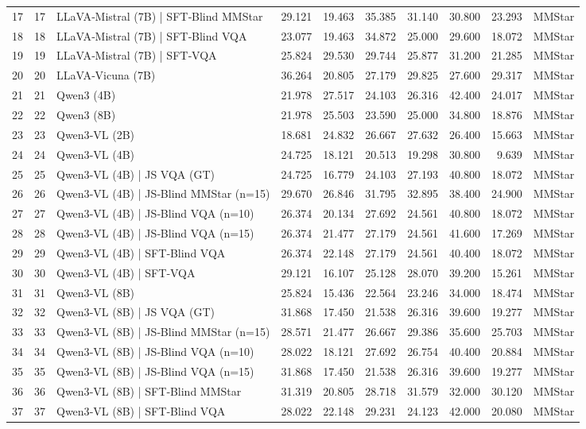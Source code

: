 \begin{tabular}{lrlrrrrrrl}
17 & 17 & LLaVA‑Mistral (7B) | SFT‑Blind MMStar & 29.121 & 19.463 & 35.385 & 31.140 & 30.800 & 23.293 & MMStar \\
18 & 18 & LLaVA‑Mistral (7B) | SFT‑Blind VQA & 23.077 & 19.463 & 34.872 & 25.000 & 29.600 & 18.072 & MMStar \\
19 & 19 & LLaVA‑Mistral (7B) | SFT‑VQA & 25.824 & 29.530 & 29.744 & 25.877 & 31.200 & 21.285 & MMStar \\
20 & 20 & LLaVA‑Vicuna (7B) & 36.264 & 20.805 & 27.179 & 29.825 & 27.600 & 29.317 & MMStar \\
21 & 21 & Qwen3 (4B) & 21.978 & 27.517 & 24.103 & 26.316 & 42.400 & 24.017 & MMStar \\
22 & 22 & Qwen3 (8B) & 21.978 & 25.503 & 23.590 & 25.000 & 34.800 & 18.876 & MMStar \\
23 & 23 & Qwen3‑VL (2B) & 18.681 & 24.832 & 26.667 & 27.632 & 26.400 & 15.663 & MMStar \\
24 & 24 & Qwen3‑VL (4B) & 24.725 & 18.121 & 20.513 & 19.298 & 30.800 & 9.639 & MMStar \\
25 & 25 & Qwen3‑VL (4B) | JS VQA (GT) & 24.725 & 16.779 & 24.103 & 27.193 & 40.800 & 18.072 & MMStar \\
26 & 26 & Qwen3‑VL (4B) | JS‑Blind MMStar (n=15) & 29.670 & 26.846 & 31.795 & 32.895 & 38.400 & 24.900 & MMStar \\
27 & 27 & Qwen3‑VL (4B) | JS‑Blind VQA (n=10) & 26.374 & 20.134 & 27.692 & 24.561 & 40.800 & 18.072 & MMStar \\
28 & 28 & Qwen3‑VL (4B) | JS‑Blind VQA (n=15) & 26.374 & 21.477 & 27.179 & 24.561 & 41.600 & 17.269 & MMStar \\
29 & 29 & Qwen3‑VL (4B) | SFT‑Blind VQA & 26.374 & 22.148 & 27.179 & 24.561 & 40.400 & 18.072 & MMStar \\
30 & 30 & Qwen3‑VL (4B) | SFT‑VQA & 29.121 & 16.107 & 25.128 & 28.070 & 39.200 & 15.261 & MMStar \\
31 & 31 & Qwen3‑VL (8B) & 25.824 & 15.436 & 22.564 & 23.246 & 34.000 & 18.474 & MMStar \\
32 & 32 & Qwen3‑VL (8B) | JS VQA (GT) & 31.868 & 17.450 & 21.538 & 26.316 & 39.600 & 19.277 & MMStar \\
33 & 33 & Qwen3‑VL (8B) | JS‑Blind MMStar (n=15) & 28.571 & 21.477 & 26.667 & 29.386 & 35.600 & 25.703 & MMStar \\
34 & 34 & Qwen3‑VL (8B) | JS‑Blind VQA (n=10) & 28.022 & 18.121 & 27.692 & 26.754 & 40.400 & 20.884 & MMStar \\
35 & 35 & Qwen3‑VL (8B) | JS‑Blind VQA (n=15) & 31.868 & 17.450 & 21.538 & 26.316 & 39.600 & 19.277 & MMStar \\
36 & 36 & Qwen3‑VL (8B) | SFT‑Blind MMStar & 31.319 & 20.805 & 28.718 & 31.579 & 32.000 & 30.120 & MMStar \\
37 & 37 & Qwen3‑VL (8B) | SFT‑Blind VQA & 28.022 & 22.148 & 29.231 & 24.123 & 42.000 & 20.080 & MMStar \\
\bottomrule
\end{tabular}
